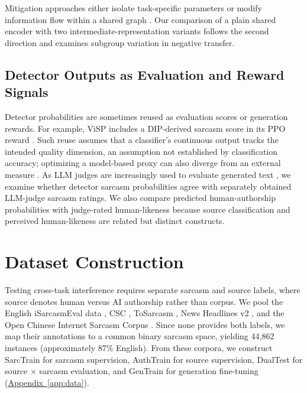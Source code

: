 \documentclass[11pt]{article}
\newcommand{\Appref}[1]{\hyperref[#1]{Appendix~\ref*{#1}}}
\begin{document}
Mitigation approaches either isolate task-specific parameters \citep{pfeiffer2021adapterfusion,pfeiffer2020madx,mahabadi2021hyperformer,stickland2019pals} or modify information flow within a shared graph \citep{wu2019sifted,pilault2021camtl}. Our comparison of a plain shared encoder with two intermediate-representation variants follows the second direction and examines subgroup variation in negative transfer.

\subsection{Detector Outputs as Evaluation and Reward Signals}
\label{sec:related-eval}

Detector probabilities are sometimes reused as evaluation scores or generation rewards. For example, ViSP \citep{wang2026visp} includes a DIP-derived sarcasm score \citep{wen2023dip} in its PPO reward \citep{schulman2017ppo}. Such reuse assumes that a classifier's continuous output tracks the intended quality dimension, an assumption not established by classification accuracy; optimizing a model-based proxy can also diverge from an external measure \citep{gao2023overoptimization}. As LLM judges are increasingly used to evaluate generated text \citep{zheng2023judging}, we examine whether detector sarcasm probabilities agree with separately obtained LLM-judge sarcasm ratings. We also compare predicted human-authorship probabilities with judge-rated human-likeness because source classification and perceived human-likeness are related but distinct constructs.

\section{Dataset Construction}
\label{sec:data}

Testing cross-task interference requires separate sarcasm and source labels, where source denotes human versus AI authorship rather than corpus. We pool the English iSarcasmEval data \citep{oprea2020isarcasm,abufarha2022isarcasmeval}, CSC \citep{jang2024csc,jang2023intended}, ToSarcasm \citep{liang2022tosarcasm}, News Headlines v2 \citep{misra2023headlines,misra2021sculpting}, and the Open Chinese Internet Sarcasm Corpus \citep{zhu2022corpus}. Since none provides both labels, we map their annotations to a common binary sarcasm space, yielding 44{,}862 instances (approximately 87\% English). From these corpora, we construct SarcTrain for sarcasm supervision, AuthTrain for source supervision, DualTest for source $\times$ sarcasm evaluation, and GenTrain for generation fine-tuning (\Appref{app:data}).
\end{document}
